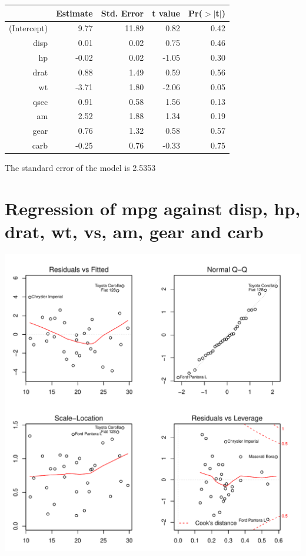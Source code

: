 \documentclass{article}\usepackage[]{graphicx}\usepackage[]{color}
\makeatletter
\def\maxwidth{ %
  \ifdim\Gin@nat@width>\linewidth
    \linewidth
  \else
    \Gin@nat@width
  \fi
}
\newenvironment{knitrout}{}{} %
\makeatother
\begin{document}
\begin{table}[ht]
\centering
\begin{tabular}{rrrrr}
  \hline
 & Estimate & Std. Error & t value & Pr($>$$|$t$|$) \\ 
  \hline
(Intercept) & 9.77 & 11.89 & 0.82 & 0.42 \\ 
  disp & 0.01 & 0.02 & 0.75 & 0.46 \\ 
  hp & -0.02 & 0.02 & -1.05 & 0.30 \\ 
  drat & 0.88 & 1.49 & 0.59 & 0.56 \\ 
  wt & -3.71 & 1.80 & -2.06 & 0.05 \\ 
  qsec & 0.91 & 0.58 & 1.56 & 0.13 \\ 
  am & 2.52 & 1.88 & 1.34 & 0.19 \\ 
  gear & 0.76 & 1.32 & 0.58 & 0.57 \\ 
  carb & -0.25 & 0.76 & -0.33 & 0.75 \\ 
   \hline
\end{tabular}
\end{table}




The standard error of the model is 2.5353

\newpage

\section{Regression of mpg against disp, hp, drat, wt, vs, am, gear and carb }
\begin{knitrout}
\color{fgcolor}

{\centering \includegraphics[width=\maxwidth]{figure/lm-disp-hp-drat-wt-vs-am-gear-carb} 

}



\end{knitrout}
\end{document}
